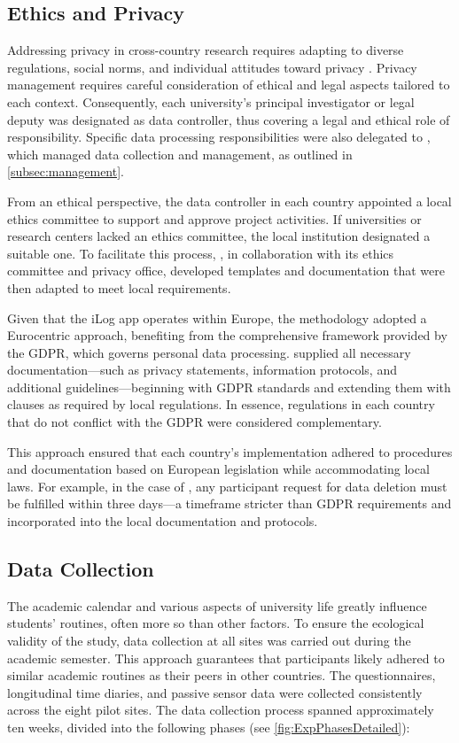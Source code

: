 \subsection{Ethics and Privacy}\label{subsec:privacy}

Addressing privacy in cross-country research requires adapting to diverse regulations, social norms, and individual attitudes toward privacy \cite{acquisti2015privacy, capurro2005privacy, ess2005lost}. Privacy management requires careful consideration of ethical and legal aspects tailored to each context. Consequently, each university's principal investigator or legal deputy was designated as data controller, thus covering a legal and ethical role of responsibility. Specific data processing responsibilities were also delegated to \UNITN, which managed data collection and management, as outlined in \cref{subsec:management}.

From an ethical perspective, the data controller in each country appointed a local ethics committee to support and approve project activities. If universities or research centers lacked an ethics committee, the local institution designated a suitable one. To facilitate this process, \UNITN, in collaboration with its ethics committee and privacy office, developed templates and documentation that were then adapted to meet local requirements.

Given that the iLog app operates within Europe, the methodology adopted a Eurocentric approach, benefiting from the comprehensive framework provided by the GDPR, which governs personal data processing. \UNITN supplied all necessary documentation—such as privacy statements, information protocols, and additional guidelines—beginning with GDPR standards and extending them with clauses as required by local regulations. In essence, regulations in each country that do not conflict with the GDPR were considered complementary.

This approach ensured that each country's implementation adhered to procedures and documentation based on European legislation while accommodating local laws. For example, in the case of \IPICYT, any participant request for data deletion must be fulfilled within three days—a timeframe stricter than GDPR requirements and incorporated into the local documentation and protocols.

\subsection{Data Collection}\label{subsec:protocol}
The academic calendar and various aspects of university life greatly influence students' routines, often more so than other factors. To ensure the ecological validity of the study, data collection at all sites was carried out during the academic semester. This approach guarantees that participants likely adhered to similar academic routines as their peers in other countries.
%
The questionnaires, longitudinal time diaries, and passive sensor data were collected consistently across the eight pilot sites. The data collection process spanned approximately ten weeks, divided into the following phases (see \cref{fig:ExpPhasesDetailed}):

